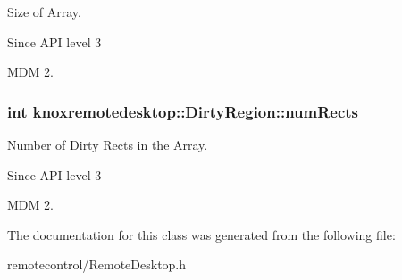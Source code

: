 \-Size of \-Array. 

\begin{DoxySince}{\-Since}
\-A\-P\-I level 3

\-M\-D\-M 2. 
\end{DoxySince}
\hypertarget{classknoxremotedesktop_1_1DirtyRegion_a433b848a889223e6b404cec9e8db0c7d}{
\subsubsection[{num\-Rects}]{\setlength{\rightskip}{0pt plus 5cm}int {\bf knoxremotedesktop\-::\-Dirty\-Region\-::num\-Rects}}}\label{classknoxremotedesktop_1_1DirtyRegion_a433b848a889223e6b404cec9e8db0c7d}


\-Number of \-Dirty \-Rects in the \-Array. 

\begin{DoxySince}{\-Since}
\-A\-P\-I level 3

\-M\-D\-M 2. 
\end{DoxySince}


\-The documentation for this class was generated from the following file\-:\begin{DoxyCompactItemize}
\item 
remotecontrol/\-Remote\-Desktop.\-h\end{DoxyCompactItemize}
